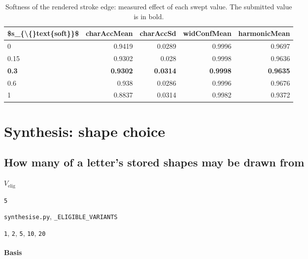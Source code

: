 \begin{table}[htbp]
\centering
\small
\caption{Softness of the rendered stroke edge: measured effect of each swept value. The submitted value is in bold.}
\begin{tabular}{lrrrr}
\toprule
\$s\_\{\textbackslash\{\}text\{soft\}\}\$ & \textsf{charAccMean} & \textsf{charAccSd} & \textsf{widConfMean} & \textsf{harmonicMean} \\
\midrule
0 & 0.9419 & 0.0289 & 0.9996 & 0.9697 \\
0.15 & 0.9302 & 0.028 & 0.9998 & 0.9636 \\
\bfseries 0.3 & \bfseries 0.9302 & \bfseries 0.0314 & \bfseries 0.9998 & \bfseries 0.9635 \\
0.6 & 0.938 & 0.0286 & 0.9996 & 0.9676 \\
1 & 0.8837 & 0.0314 & 0.9982 & 0.9372 \\
\bottomrule
\end{tabular}
\end{table}

\section{Synthesis: shape choice}

\subsection{How many of a letter's stored shapes may be drawn from}

\label{coef:eligible-variants}

\begin{description}[leftmargin=5.2em,style=sameline]

\item[Symbol] $V_{\text{elig}}$

\item[Value] \texttt{5}

\item[Source] \texttt{synthesise.py}, \texttt{\_ELIGIBLE\_VARIANTS}

\item[Swept] \texttt{1}, \texttt{2}, \texttt{5}, \texttt{10}, \texttt{20}

\end{description}

\paragraph{Basis}

